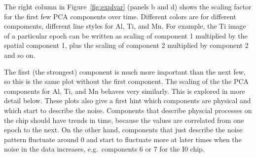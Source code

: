 \documentclass[]{spie}  %
\begin{document}
The right column in Figure~\ref{fig:explvar} (panels b and d) shows the scaling factor for the first few PCA components over time. Different colors are for different compoments, different line styles for Al, Ti, and Mn. For example, the Ti image of a particular epoch can be written as scaling of component 1 multiplied by the spatial component 1, plus the scaling of component 2 multiplied by component 2 and so on.

The first (the strongest) component is much more important than the next few, so this is the same plot without the first component. The scaling of the the PCA components for Al, Ti, and Mn behaves very similarly. This is explored in more detail below. These plots also give a first hint which components are physical and which start to describe the noise. Components that describe physcial processes on the chip should have trends in time, because the values are correlated from one epoch to the next. On the other hand, components that just describe the noise pattern fluctuate around 0 and start to fluctuate more at later times when the noise in the data increases, e.g.\ components 6 or 7 for the I0 chip.
\end{document}

